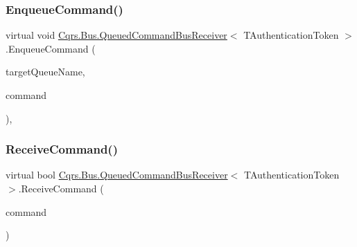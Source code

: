 \mbox{\label{classCqrs_1_1Bus_1_1QueuedCommandBusReceiver_ab27ff7119814cdc22bf9a5811340e4e7}} 
\subsubsection{\texorpdfstring{Enqueue\+Command()}{EnqueueCommand()}}
{\footnotesize\ttfamily virtual void \hyperlink{classCqrs_1_1Bus_1_1QueuedCommandBusReceiver}{Cqrs.\+Bus.\+Queued\+Command\+Bus\+Receiver}$<$ T\+Authentication\+Token $>$.Enqueue\+Command (\begin{DoxyParamCaption}\item[{string}]{target\+Queue\+Name,  }\item[{\hyperlink{interfaceCqrs_1_1Commands_1_1ICommand}{I\+Command}$<$ T\+Authentication\+Token $>$}]{command }\end{DoxyParamCaption})\hspace{0.3cm}{\ttfamily [protected]}, {\ttfamily [virtual]}}

\mbox{\label{classCqrs_1_1Bus_1_1QueuedCommandBusReceiver_aad9ab381afcc8346479ab9cabdf1046a}} 
\subsubsection{\texorpdfstring{Receive\+Command()}{ReceiveCommand()}}
{\footnotesize\ttfamily virtual bool \hyperlink{classCqrs_1_1Bus_1_1QueuedCommandBusReceiver}{Cqrs.\+Bus.\+Queued\+Command\+Bus\+Receiver}$<$ T\+Authentication\+Token $>$.Receive\+Command (\begin{DoxyParamCaption}\item[{\hyperlink{interfaceCqrs_1_1Commands_1_1ICommand}{I\+Command}$<$ T\+Authentication\+Token $>$}]{command }\end{DoxyParamCaption})\hspace{0.3cm}{\ttfamily [virtual]}}

